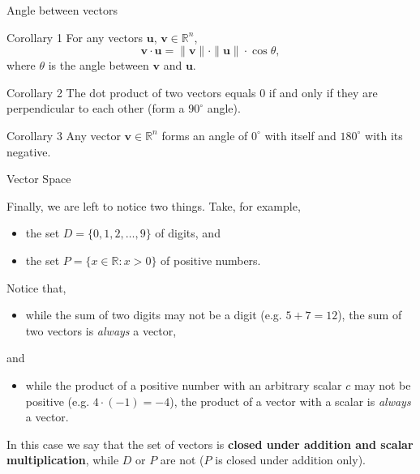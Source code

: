 \documentclass{beamer}
\newcommand{\vv}{\mathbf{v}}
\newcommand{\vu}{\mathbf{u}}
\newcommand{\R}{\mathbb{R}}
\begin{document}
\begin{frame}{Angle between vectors}
  \begin{block}{Corollary 1}
    For any vectors \( \mathbf{u} \), \( \mathbf{v} \in  \mathbb{R}^n \), 
    \[ \vv \cdot \vu  = \|\vv\| \cdot \|\vu\| \cdot \cos{\theta},\]
    where $\theta$ is the angle between $\vv$ and $\vu$.
  \end{block}
  \pause 
  \begin{block}{Corollary 2}
  The dot product of two vectors equals 0 if and only if they are perpendicular to each other (form a $90^\circ$ angle).
  \end{block}
  
  \pause 
  \begin{block}{Corollary 3}
 Any vector \( \mathbf{v} \in  \mathbb{R}^n \) forms an angle of $0^\circ$ with itself and $180^\circ$ with its negative.
  \end{block}
  
\end{frame}




\begin{frame}{Vector Space}

Finally, we are left to notice two things. Take, for example, 
\begin{itemize}
    \item the set $D=\{0, 1, 2, \dots, 9\}$ of digits, and
    \item the set $P=\{x \in \R : x > 0\}$ of positive numbers.
\end{itemize}

\pause

Notice that,
\begin{itemize}
    \item while the sum of two digits may not be a digit (e.g. $5+7=12$), the sum of two vectors is \textit{always} a vector,
\end{itemize} \pause
and
\begin{itemize}
    \item while the product of a positive number with an arbitrary scalar $c$ may not be positive (e.g. $4 \cdot (-1)=-4$), the product of a vector with a scalar is \textit{always} a vector.
\end{itemize}

\pause

In this case we say that the set of vectors is \textbf{closed under addition and scalar multiplication}, while $D$ or $P$ are not ($P$ is closed under addition only).

\end{frame}
\end{document}

